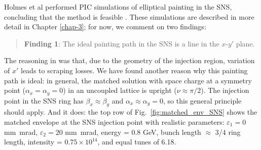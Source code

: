Holmes et al performed PIC simulations of elliptical painting in the SNS, concluding that the method is feasible \cite{Holmes2018}. These simulations are described in more detail in Chapter \ref{chap-3}; for now, we comment on two findings:
%
\begin{quote}
    \textbf{Finding 1}: The ideal painting path in the SNS is a line in the $x$-$y'$ plane.
\end{quote}
%
The reasoning in \cite{Holmes2018} was that, due to the geometry of the injection region, variation of $x'$ leads to scraping losses. We have found another reason why this painting path is ideal: in general, the matched solution with space charge at a symmetry point ($\alpha_x = \alpha_y = 0$) in an uncoupled lattice is upright ($\nu \approx \pi/2$). The injection point in the SNS ring has $\beta_x \approx \beta_y$ and $\alpha_x \approx \alpha_y = 0$, so this general principle should apply. And it does: the top row of Fig.~\ref{fig:matched_env_SNS} shows the matched envelope at the SNS injection point with realistic parameters: $\varepsilon_1 = 0$ mm~mrad, $\varepsilon_2 = 20$ mm~mrad, energy = 0.8 GeV, bunch length $\approx$ 3/4 ring length, intensity = $0.75 \times 10^{14}$, and  equal tunes of 6.18.
%
